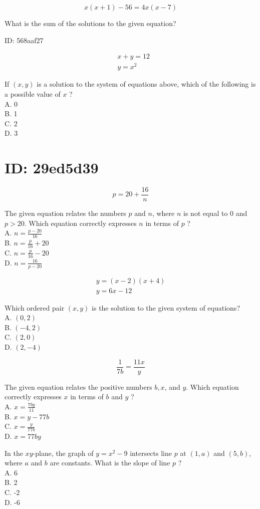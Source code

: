 $$
x(x+1)-56=4 x(x-7)
$$

What is the sum of the solutions to the given equation?

ID: 568aaf27

$$
\begin{aligned}
& x+y=12 \\
& y=x^{2}
\end{aligned}
$$

If $(x, y)$ is a solution to the system of equations above, which of the following is a possible value of $x$ ?\\
A. 0\\
B. 1\\
C. 2\\
D. 3

\section*{ID: 29ed5d39}
$$
p=20+\frac{16}{n}
$$

The given equation relates the numbers $p$ and $n$, where $n$ is not equal to 0 and $p>20$. Which equation correctly expresses $n$ in terms of $p$ ?\\
A. $n=\frac{p-20}{16}$\\
B. $n=\frac{p}{16}+20$\\
C. $n=\frac{p}{16}-20$\\
D. $n=\frac{16}{p-20}$

$$
\begin{gathered}
y=(x-2)(x+4) \\
y=6 x-12
\end{gathered}
$$

Which ordered pair $(x, y)$ is the solution to the given system of equations?\\
A. $(0,2)$\\
B. $(-4,2)$\\
C. $(2,0)$\\
D. $(2,-4)$

$$
\frac{1}{7 b}=\frac{11 x}{y}
$$

The given equation relates the positive numbers $b, x$, and $y$. Which equation correctly expresses $x$ in terms of $b$ and $y$ ?\\
A. $x=\frac{7 b y}{11}$\\
B. $x=y-77 b$\\
C. $x=\frac{y}{77 b}$\\
D. $x=77 b y$

In the $x y$-plane, the graph of $y=x^{2}-9$ intersects line $p$ at $(1, a)$ and $(5, b)$, where $a$ and $b$ are constants. What is the slope of line $p$ ?\\
A. 6\\
B. 2\\
C. -2\\
D. -6


